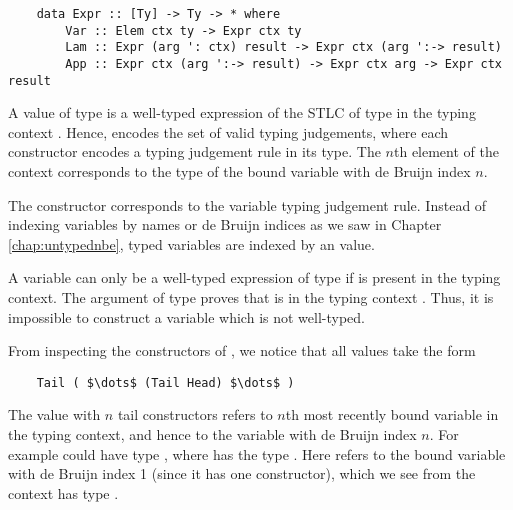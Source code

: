 \begin{lstlisting}
    data Expr :: [Ty] -> Ty -> * where
        Var :: Elem ctx ty -> Expr ctx ty
        Lam :: Expr (arg ': ctx) result -> Expr ctx (arg ':-> result)
        App :: Expr ctx (arg ':-> result) -> Expr ctx arg -> Expr ctx result 
\end{lstlisting}

A value of type  is a well-typed expression of the STLC of type  in the typing context . Hence,  encodes the set of valid typing judgements, where each constructor encodes a typing judgement rule in its type. The $n$th element of the context corresponds to the type of the bound variable with de Bruijn index $n$.

The  constructor corresponds to the variable typing judgement rule. Instead of indexing variables by names or de Bruijn indices as we saw in Chapter \ref{chap:untypednbe}, typed variables are indexed by an  value.


A variable can only be a well-typed expression of type  if  is present in the typing context. The argument of type  proves that  is in the typing context . Thus, it is impossible to construct a variable which is not well-typed.

From inspecting the constructors of , we notice that all  values take the form 

\begin{lstlisting}
    Tail ( $\dots$ (Tail Head) $\dots$ ) 
\end{lstlisting}

The  value with $n$ tail constructors refers to $n$th most recently bound variable in the typing context, and hence to the variable with de Bruijn index $n$. For example  could have type , where  has the type . Here  refers to the bound variable with de Bruijn index 1 (since it has one  constructor), which we see from the context has type .


